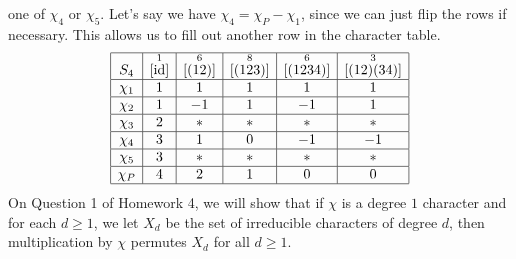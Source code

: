 \begin{exmp}{}
    one of $\chi_4$ or $\chi_5$. Let's say we have $\chi_4 = \chi_P - \chi_1$, since we 
    can just flip the rows if necessary. This allows us to fill out another row in 
    the character table. 
    \begin{align*}
        \begin{array}{|c|c|c|c|c|c|}
            \hline
            S_4    & \overset{1}{[\operatorname{id}]} & \overset{6}{[(12)]} & \overset{8}{[(123)]} & \overset{6}{[(1234)]} & \overset{3}{[(12)(34)]} \\ \hline
            \chi_1 & 1                  & 1                   & 1                    & 1                     & 1                       \\ \hline
            \chi_2 & 1                  & -1                  & 1                    & -1                    & 1                       \\ \hline
            \chi_3 & 2                  & *                   & *                    & *                     & *                       \\ \hline
            \chi_4 & 3                  & 1                   & 0                    & -1                    & -1                      \\ \hline
            \chi_5 & 3                  & *                   & *                    & *                     & *                       \\ \hline
            \chi_P & 4                  & 2                   & 1                    & 0                     & 0                       \\ \hline 
        \end{array} 
    \end{align*}
    On Question 1 of Homework 4, we will show that if $\chi$ is a degree $1$ 
    character and for each $d \geq 1$, we let $X_d$ be the set of irreducible 
    characters of degree $d$, then multiplication by $\chi$ permutes $X_d$ 
    for all $d \geq 1$. 


\end{exmp}
